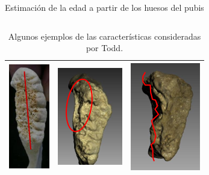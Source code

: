 \documentclass{beamer}
\begin{document}
\begin{frame}{Estimación de la edad a partir de los huesos del pubis}
\begin{columns}[T]
\begin{column}{.7\textwidth}
\begin{table}[H]
{\begin{tabular}{|c|c|c|}
					\includegraphics[scale = 0.75]{huesos/plataforma_dorsal_presente.png} & \includegraphics[scale = 0.75]{huesos/bisel_ventral_en_proceso_formacion.png} &   \includegraphics[scale = 0.75]{huesos/borde_ventral_muchas_excrecencias.png} \\ \hline
					\end{tabular}%
				}
				\caption{Algunos ejemplos de las características consideradas por Todd\cite{todd}.}\label{table:caracteristicas_todd}
			\end{table}
		\end{column}

	\end{columns}


\end{frame}
\end{document}
